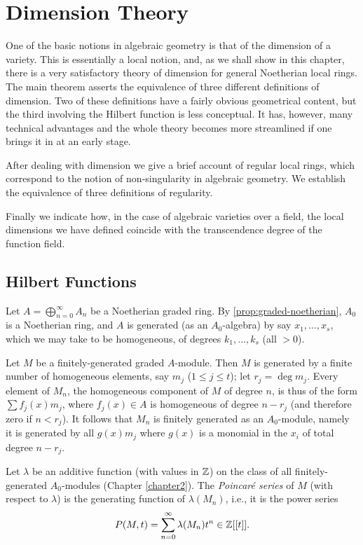 \chapter{Dimension Theory}\label{chapter11}

One of the basic notions in algebraic geometry is that of the dimension of a variety. This is essentially a local notion, and, as we shall show in this chapter, there is a very satisfactory theory of dimension for general Noetherian local rings. The main theorem asserts the equivalence of three different definitions of dimension. Two of these definitions have a fairly obvious geometrical content, but the third involving the Hilbert function is less conceptual. It has, however, many technical advantages and the whole theory becomes more streamlined if one brings it in at an early stage.

After dealing with dimension we give a brief account of regular local rings, which correspond to the notion of non-singularity in algebraic geometry. We establish the equivalence of three definitions of regularity.

Finally we indicate how, in the case of algebraic varieties over a field, the local dimensions we have defined coincide with the transcendence degree of the function field.

\section*{Hilbert Functions}
Let $A = \bigoplus_{n=0}^\infty A_n$ be a Noetherian graded ring. By \eqref{prop:graded-noetherian}, $A_0$ is a Noetherian ring, and $A$ is generated (as an $A_0$-algebra) by say $x_1, \ldots, x_s$, which we may take to be homogeneous, of degrees $k_1, \ldots, k_s$ (all $> 0$).

Let $M$ be a finitely-generated graded $A$-module. Then $M$ is generated by a finite number of homogeneous elements, say $m_j$ ($1 \leq j \leq t$); let $r_j = \deg m_j$. Every element of $M_n$, the homogeneous component of $M$ of degree $n$, is thus of the form $\sum f_j(x)m_j$, where $f_j(x) \in A$ is homogeneous of degree $n - r_j$ (and therefore zero if $n < r_j$). It follows that $M_n$ is finitely generated as an $A_0$-module, namely it is generated by all $g(x)m_j$ where $g(x)$ is a monomial in the $x_i$ of total degree $n - r_j$.

Let $\lambda$ be an additive function (with values in $\mathbb{Z}$) on the class of all finitely-generated $A_0$-modules (Chapter \ref{chapter2}). The \emph{Poincar\'e series} of $M$ (with respect to $\lambda$) is the generating function of $\lambda(M_n)$, i.e., it is the power series
\[
    P(M, t) = \sum_{n=0}^\infty \lambda(M_n)t^n \in \mathbb{Z}[[t]].
\]


